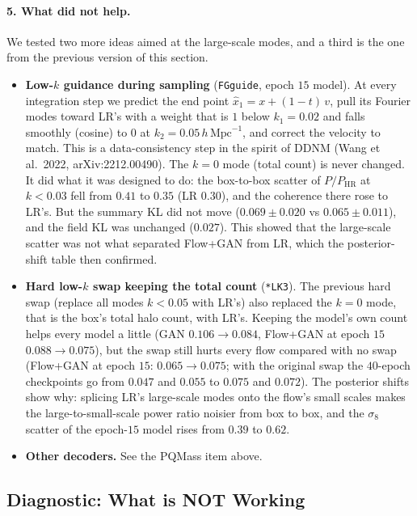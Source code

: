 \paragraph{5. What did not help.} We tested two more ideas aimed at the
large-scale modes, and a third is the one from the previous version of this section.
\begin{itemize}
  \item \textbf{Low-$k$ guidance during sampling} (\texttt{FGguide}, epoch $15$
  model). At every integration step we predict the end point
  $\hat x_1 = x + (1-t)\,v$, pull its Fourier modes toward LR's with a weight that
  is $1$ below $k_1=0.02$ and falls smoothly (cosine) to $0$ at $k_2=0.05\,h\,\mathrm{Mpc}^{-1}$,
  and correct the velocity to match. This is a data-consistency step in the spirit
  of DDNM (Wang et al.\ 2022, arXiv:2212.00490). The $k=0$ mode (total count) is
  never changed. It did what it was designed to do: the box-to-box scatter of
  $P/P_\text{HR}$ at $k<0.03$ fell from $0.41$ to $0.35$ (LR $0.30$), and the
  coherence there rose to LR's. But the summary KL did not move ($0.069\pm0.020$
  vs $0.065\pm0.011$), and the field KL was unchanged ($0.027$). This showed that
  the large-scale scatter was not what separated Flow+GAN from LR, which the
  posterior-shift table then confirmed.
  \item \textbf{Hard low-$k$ swap keeping the total count} (\texttt{*LK3}). The
  previous hard swap (replace all modes $k<0.05$ with LR's) also replaced the $k=0$
  mode, that is the box's total halo count, with LR's. Keeping the model's own
  count helps every model a little (GAN $0.106\to0.084$, Flow+GAN at epoch $15$
  $0.088\to0.075$), but the swap still hurts every flow compared with no swap
  (Flow+GAN at epoch $15$: $0.065\to0.075$; with the original swap the $40$-epoch
  checkpoints go from $0.047$ and $0.055$ to $0.075$ and $0.072$). The posterior
  shifts show why: splicing LR's large-scale modes onto the flow's small scales
  makes the large-to-small-scale power ratio noisier from box to box, and the
  $\sigma_8$ scatter of the epoch-$15$ model rises from $0.39$ to $0.62$.
  \item \textbf{Other decoders.} See the PQMass item above.
\end{itemize}

\subsection{Diagnostic: What is NOT Working}

